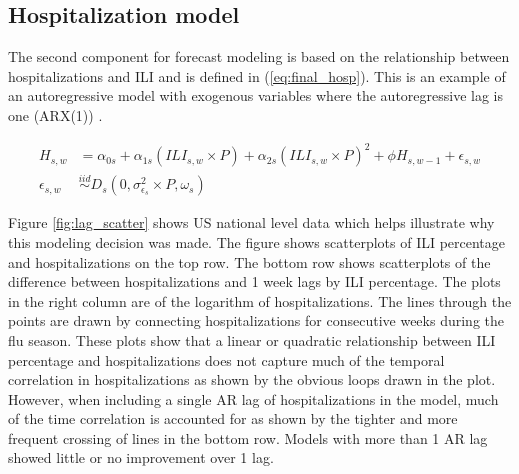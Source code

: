 \subsection{Hospitalization model} \label{sec:hospital_model}

The second component for forecast modeling is based on the relationship between 
hospitalizations and ILI and is defined in (\ref{eq:final_hosp}).
This is an example of an autoregressive model with exogenous variables where 
the autoregressive lag is one (ARX(1)) 
\cite[]{raftery2010online,ljung1987system}. 

\begin{equation}
    \begin{aligned}
    \label{eq:final_hosp}
    H_{s,w} &= \alpha_{0s} + \alpha_{1s} (ILI_{s,w} \times P) + \alpha_{2s} 
    (ILI_{s,w} \times P)^2 + \phi H_{s,w-1} + \epsilon_{s,w}\\ 
    \epsilon_{s,w} &\overset{iid}{\sim} D_s(0, \sigma_{\epsilon_s}^2 \times P, 
    \omega_s) %
    \end{aligned}
\end{equation}

Figure \ref{fig:lag_scatter} shows US national level data which helps
illustrate why this modeling decision was made.
The figure shows scatterplots of ILI percentage and 
hospitalizations on the top row.
The bottom row shows scatterplots of the difference between hospitalizations and 
1 week lags
by ILI percentage. The plots in the right column
are of the logarithm of hospitalizations. The lines through the points are
drawn by connecting hospitalizations for consecutive weeks during the flu 
season.
These plots show that a linear or quadratic relationship between ILI percentage 
and hospitalizations does not capture much of the temporal correlation in 
hospitalizations as shown by the obvious loops drawn in the plot. 
However, when including a 
single AR lag of hospitalizations in the model, much of the time 
correlation is
accounted for as shown by the tighter and more frequent crossing of lines
in the bottom row. Models with more than 1 AR lag showed little or no 
improvement over 1 lag. 

